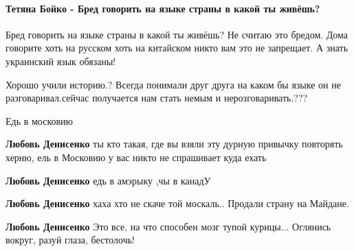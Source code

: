  
 
 
 
 

\paragraph{Тетяна Бойко - Бред говорить на языке страны в какой ты живёшь?}

\begin{itemize}
Бред говорить на языке страны в какой ты живёшь? Не считаю это бредом. Дома
говорите хоть на русском хоть на китайском никто вам это не запрещает. А знать
украинский язык обязаны!

Хорошо учили историю.? Всегда понимали друг друга на каком бы языке он не
разговаривал.сейчас получается нам стать немым и нерозговаривать.???

Едь в московию

\begin{itemize}
\textbf{Любовь Денисенко} ты кто такая, где вы взяли эту дурную привычку повторять херню, ель в Московию у вас никто не спрашивает куда ехать

\textbf{Любовь Денисенко} едь в амэрыку ,чы в канадУ

\textbf{Любовь Денисенко} хаха хто не скаче той москаль.. Продали страну на Майдане.

\textbf{Любовь Денисенко}
Это все, на что способен мозг тупой курицы... Оглянись вокруг, разуй глаза, бестолочь!
\end{itemize}



\end{itemize}

